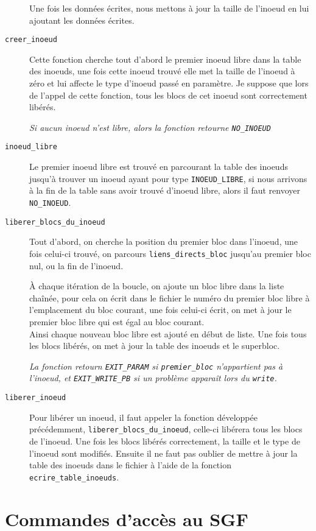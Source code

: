 \documentclass[a4paper, 11pt]{article}
\begin{document}
\begin{description}
				Une fois les données écrites, nous mettons à jour la taille de l'inoeud en lui ajoutant les données écrites.
			\item[\texttt{creer\_inoeud}] Cette fonction cherche tout d'abord le premier inoeud libre dans la table des inoeuds, une fois cette inoeud trouvé
				elle met la taille de l'inoeud à zéro et lui affecte le type d'inoeud passé en paramètre. Je suppose que lors de l'appel de cette fonction,
				tous les blocs de cet inoeud sont correctement libérés. 

				\textit{Si aucun inoeud n'est libre, alors la fonction retourne \texttt{NO\_INOEUD}}
			\item[\texttt{inoeud\_libre}] Le premier inoeud libre est trouvé en parcourant la table des inoeuds jusqu'à trouver un inoeud ayant pour type
				\texttt{INOEUD\_LIBRE}, si nous arrivons à la fin de la table sans avoir trouvé d'inoeud libre, alors il faut renvoyer \texttt{NO\_INOEUD}. 
			\item[\texttt{liberer\_blocs\_du\_inoeud}]
				Tout d'abord, on cherche la position du premier bloc dans l'inoeud, une fois celui-ci trouvé, on parcours \texttt{liens\_directs\_bloc} jusqu'au
				premier bloc nul, ou la fin de l'inoeud.

				À chaque itération de la boucle, on ajoute un bloc libre dans la liste chaînée, pour cela on écrit dans le fichier le numéro du premier bloc
				libre à l'emplacement du bloc courant, une fois celui-ci écrit, on met à jour le premier bloc libre qui est égal au bloc courant. \\
				Ainsi chaque nouveau bloc libre est ajouté en début de liste. Une fois tous les blocs libérés, on met à jour la table des inoeuds et le
				superbloc.

				\textit{La fonction retourn \texttt{EXIT\_PARAM} si \texttt{premier\_bloc} n'appartient pas à l'inoeud, et \texttt{EXIT\_WRITE\_PB} si un 
				problème apparaît lors du \texttt{write}.}
			\item[\texttt{liberer\_inoeud}] Pour libérer un inoeud, il faut appeler la fonction développée précédemment, \texttt{liberer\_blocs\_du\_inoeud},
				celle-ci libérera tous les blocs de l'inoeud. Une fois les blocs libérés correctement, la taille et le type de l'inoeud sont modifiés. Ensuite il
				ne faut pas oublier de mettre à jour la table des inoeuds dans le fichier à l'aide de la fonction \texttt{ecrire\_table\_inoeuds}.
		\end{description}
	\section{Commandes d'accès au SGF}
\end{document}
